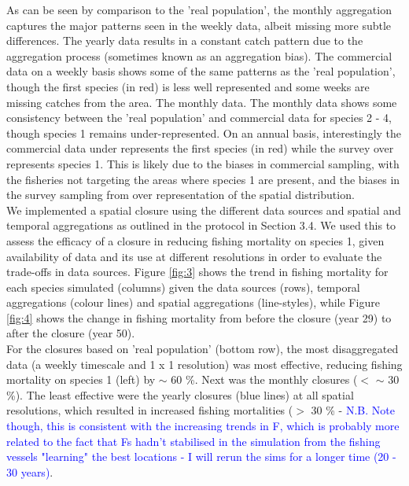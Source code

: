 \documentclass[review]{elsarticle}
\begin{document}
As can be seen by comparison to the 'real population', the monthly aggregation
captures the major patterns seen in the weekly data, albeit missing more subtle
differences. The yearly data results in a constant catch pattern due to the
aggregation process (sometimes known as an aggregation bias). The commercial
data on a weekly basis shows some of the same patterns as the 'real
population', though the first species (in red) is less well represented and
some weeks are missing catches from the area. The monthly data. The monthly
data shows some consistency between the 'real population' and commercial data
for species 2 - 4, though species 1 remains under-represented. On an annual
basis, interestingly the commercial data under represents the first species (in
red) while the survey over represents species 1. This is likely due to the
biases in commercial sampling, with the fisheries not targeting the areas where
species 1 are present, and the biases in the survey sampling from over
representation of the spatial distribution. \\

We implemented a spatial closure using the different data sources and spatial
and temporal aggregations as outlined in the protocol in Section 3.4. We used
this to assess the efficacy of a closure in reducing fishing mortality on
species 1, given availability of data and its use at different resolutions in
order to evaluate the trade-offs in data sources. Figure \ref{fig:3} shows the
trend in fishing mortality for each species simulated (columns) given the data
sources (rows), temporal aggregations (colour lines) and spatial aggregations
(line-styles), while Figure \ref{fig:4} shows the change in fishing mortality
from before the closure (year 29) to after the closure (year 50). \\

For the closures based on 'real population' (bottom row), the most
disaggregated data (a weekly timescale and 1 x 1 resolution) was most
effective, reducing fishing mortality on species 1 (left) by $\sim$ 60 \%. Next
was the monthly closures ($<$ $\sim$ 30 \%).  The least effective were the
yearly closures (blue lines) at all spatial resolutions, which resulted in
increased fishing mortalities ($>$ 30 \% - \textcolor{blue}{N.B. Note though,
	this is consistent with the increasing trends in F, which is probably
	more related to the fact that Fs hadn't stabilised in the simulation
	from the fishing vessels "learning" the best locations - I will rerun
	the sims for a longer time (20 - 30 years)}. \\
\end{document}
